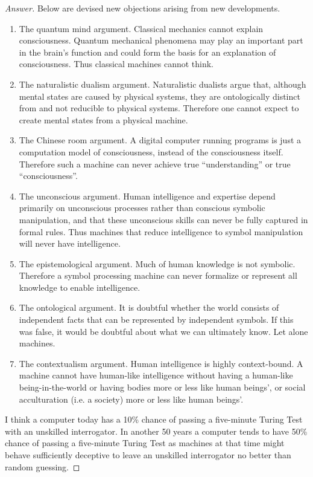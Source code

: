 \documentclass{amsbook}
\theoremstyle{definition}
\theoremstyle{remark}
\numberwithin{section}{chapter}
\numberwithin{equation}{chapter}
\begin{document}
\begin{proof}[Answer]
Below are devised new objections arising from new developments.
\begin{enumerate}
\item The quantum mind argument. Classical mechanics cannot explain consciousness. Quantum mechanical phenomena may play an important part in the brain's function and could form the basis for an explanation of consciousness. Thus classical machines cannot think.
\item The naturalistic dualism argument. Naturalistic dualists argue that, although mental states are caused by physical systems, they are ontologically distinct from and not reducible to physical systems. Therefore one cannot expect to create mental states from a physical machine.
\item The Chinese room argument. A digital computer running programs is just a computation model of consciousness, instead of the consciousness itself. Therefore such a machine can never achieve true ``understanding'' or true ``consciousness''.
\item The unconscious argument. Human intelligence and expertise depend primarily on unconscious processes rather than conscious symbolic manipulation, and that these unconscious skills can never be fully captured in formal rules. Thus machines that reduce intelligence to symbol manipulation will never have intelligence.
\item The epistemological argument. Much of human knowledge is not symbolic. Therefore a symbol processing machine can never formalize or represent all knowledge to enable intelligence.
\item The ontological argument. It is doubtful whether the world consists of independent facts that can be represented by independent symbols. If this was false, it would be doubtful about what we can ultimately know. Let alone machines.
\item The contextualism argument. Human intelligence is highly context-bound. A machine cannot have human-like intelligence without having a human-like being-in-the-world or having bodies more or less like human beings', or social acculturation (i.e. a society) more or less like human beings'.
\end{enumerate}

I think a computer today has a 10\% chance of passing a five-minute Turing Test with an unskilled interrogator. In another 50 years a computer tends to have 50\% chance of passing a five-minute Turing Test as machines at that time might behave sufficiently deceptive to leave an unskilled interrogator no better than random guessing.
\end{proof}
\end{document}
